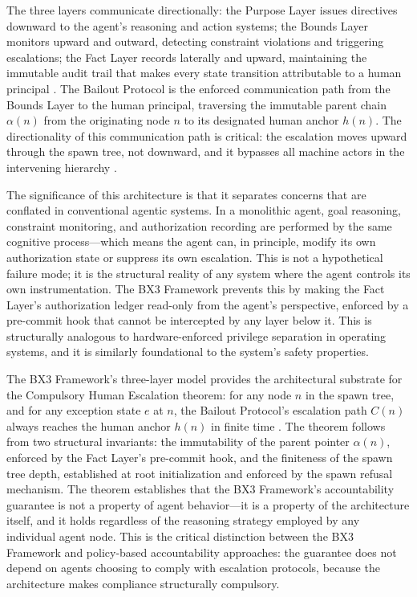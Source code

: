 The three layers communicate directionally: the Purpose Layer issues directives downward to the agent's reasoning and action systems; the Bounds Layer monitors upward and outward, detecting constraint violations and triggering escalations; the Fact Layer records laterally and upward, maintaining the immutable audit trail that makes every state transition attributable to a human principal \cite{bx3framework2026}. The Bailout Protocol is the enforced communication path from the Bounds Layer to the human principal, traversing the immutable parent chain $\alpha(n)$ from the originating node $n$ to its designated human anchor $h(n)$. The directionality of this communication path is critical: the escalation moves upward through the spawn tree, not downward, and it bypasses all machine actors in the intervening hierarchy \cite{bailoutprotocol2026}.

The significance of this architecture is that it separates concerns that are conflated in conventional agentic systems. In a monolithic agent, goal reasoning, constraint monitoring, and authorization recording are performed by the same cognitive process---which means the agent can, in principle, modify its own authorization state or suppress its own escalation. This is not a hypothetical failure mode; it is the structural reality of any system where the agent controls its own instrumentation. The BX3 Framework prevents this by making the Fact Layer's authorization ledger read-only from the agent's perspective, enforced by a pre-commit hook that cannot be intercepted by any layer below it. This is structurally analogous to hardware-enforced privilege separation in operating systems, and it is similarly foundational to the system's safety properties.

The BX3 Framework's three-layer model provides the architectural substrate for the Compulsory Human Escalation theorem: for any node $n$ in the spawn tree, and for any exception state $e$ at $n$, the Bailout Protocol's escalation path $C(n)$ always reaches the human anchor $h(n)$ in finite time \cite{bx3framework2026}. The theorem follows from two structural invariants: the immutability of the parent pointer $\alpha(n)$, enforced by the Fact Layer's pre-commit hook, and the finiteness of the spawn tree depth, established at root initialization and enforced by the spawn refusal mechanism. The theorem establishes that the BX3 Framework's accountability guarantee is not a property of agent behavior---it is a property of the architecture itself, and it holds regardless of the reasoning strategy employed by any individual agent node. This is the critical distinction between the BX3 Framework and policy-based accountability approaches: the guarantee does not depend on agents choosing to comply with escalation protocols, because the architecture makes compliance structurally compulsory.